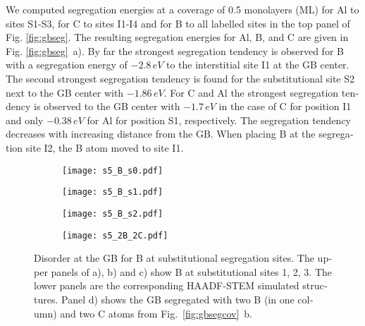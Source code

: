 \documentclass[12pt,a4paper,twoside,twocolumn,english,english]{article}
\begin{document}
\begin{otherlanguage}{english}
We computed segregation energies at a coverage of 0.5 monolayers (ML) for Al to sites S1-S3, for C to sites I1-I4 and for B to all labelled sites in the top panel of Fig. \ref{fig:gbseg}. The resulting segregation energies  for Al, B, and C are given in Fig. \ref{fig:gbseg}~a). By far the strongest segregation tendency is observed for B with a segregation energy of $-2.8\,\unit{eV}$ to the interstitial site I1 at the GB center. The second strongest segregation tendency is found for the substitutional site S2 next to the GB center with $-1.86\,\unit{eV}$. For C and Al the strongest segregation tendency is observed to the GB center with $-1.7\,\unit{eV}$ in the case of C for position I1 and only $-0.38\,\unit{eV}$ for Al for position S1, respectively. The segregation tendency decreases with increasing distance from the GB. When placing B at the segregation site I2, the B atom moved to site I1.


\begin{figure*}[htbp]
\centering
\begin{subfigure}[c]{0.24\linewidth}
\texttt{[image: s5\_B\_s0.pdf]}
\caption{}
\end{subfigure}
\begin{subfigure}[c]{0.24\linewidth}
\texttt{[image: s5\_B\_s1.pdf]}
\caption{}
\end{subfigure}
\begin{subfigure}[c]{0.24\linewidth}
\texttt{[image: s5\_B\_s2.pdf]}
\caption{}
\end{subfigure}
\begin{subfigure}[c]{0.24\linewidth}
\texttt{[image: s5\_2B\_2C.pdf]}
\caption{}
\end{subfigure}
\caption{Disorder at the GB for B at substitutional segregation sites. The upper panels of a), b) and c) show B at substitutional sites 1, 2, 3. The lower panels are the corresponding HAADF-STEM simulated structures. Panel d) shows the GB segregated with two B (in one column) and two C atoms from Fig.~\ref{fig:gbsegcov}~b.
}
\label{fig:Bsub}
\end{figure*}


\end{otherlanguage}
\end{document}
